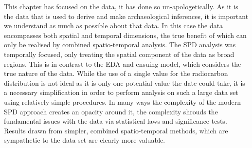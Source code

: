 This chapter has focused on the data, it has done so un-apologetically. As it is the data that is used to derive and make archaeological inferences, it is important we understand as much as possible about that data. In this case the data encompasses both spatial and temporal dimensions,  the true benefit of which can only be realised by combined spatio-temporal analysis. The SPD analysis was temporally focused, only treating the spatial component of the data as broad regions.
This is in contrast to the EDA and ensuing model, which considers the true nature of the data. While the use of a single value for the radiocarbon distribution is not ideal as it is only one potential value the date could take, it is a necessary simplification in order to perform analysis on such a large data set using relatively simple procedures. In many ways the complexity of the modern SPD approach creates an opacity around it, the complexity shrouds the fundamental issues with the data via statistical laws and significance tests. Results drawn from simpler, combined spatio-temporal methods, which are sympathetic to the data set are clearly more valuable.